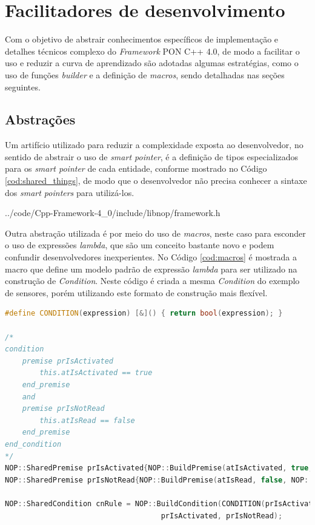 \section{Facilitadores de desenvolvimento}\label{sec:facilitadores}

Com o objetivo de abstrair conhecimentos específicos de implementação e detalhes
técnicos complexo do \textit{Framework} PON C++ 4.0, de modo a facilitar o uso e
reduzir a curva de aprendizado são adotadas algumas estratégias, como o uso de
funções \textit{builder} e a definição de \textit{macros}, sendo detalhadas nas
seções seguintes.

\subsection{Abstrações}\label{sec:abstractions}

Um artifício utilizado para reduzir a complexidade exposta ao desenvolvedor, no
sentido de abstrair o uso de \textit{smart pointer}, é a definição de tipos
especializados para os \textit{smart pointer} de cada entidade, conforme
mostrado no Código \ref{cod:shared_things}, de modo que o desenvolvedor não
precisa conhecer a sintaxe dos \textit{smart pointers} para utilizá-los.


            {../code/Cpp-Framework-4_0/include/libnop/framework.h}

\FloatBarrier

Outra abstração utilizada é por meio do uso de \textit{macros}, neste caso para
esconder o uso de expressões \textit{lambda}, que são um conceito bastante novo
e podem confundir desenvolvedores inexperientes. No Código \ref{cod:macros} é
mostrada a macro que define um modelo padrão de expressão \textit{lambda} para
ser utilizado na construção de \textit{Condition}. Neste código é criada a mesma
\textit{Condition} do exemplo de sensores, porém utilizando este formato de
construção mais flexível.

\begin{lstlisting}[language=C++, float=htb,
caption = {Uso de \textit{Macros} para abstrair o uso de expressões \textit{lambda} no \textit{Framework} PON C++ 4.0},
source = {Autoria própria},
label ={cod:macros}]
#define CONDITION(expression) [&]() { return bool(expression); }

/*
condition
    premise prIsActivated
        this.atIsActivated == true
    end_premise
    and
    premise prIsNotRead
        this.atIsRead == false
    end_premise
end_condition
*/
NOP::SharedPremise prIsActivated{NOP::BuildPremise(atIsActivated, true, NOP::Equal())};
NOP::SharedPremise prIsNotRead{NOP::BuildPremise(atIsRead, false, NOP::Equal())};

NOP::SharedCondition cnRule = NOP::BuildCondition(CONDITION(prIsActivated && prIsNotRead)
                                    prIsActivated, prIsNotRead);

\end{lstlisting}

